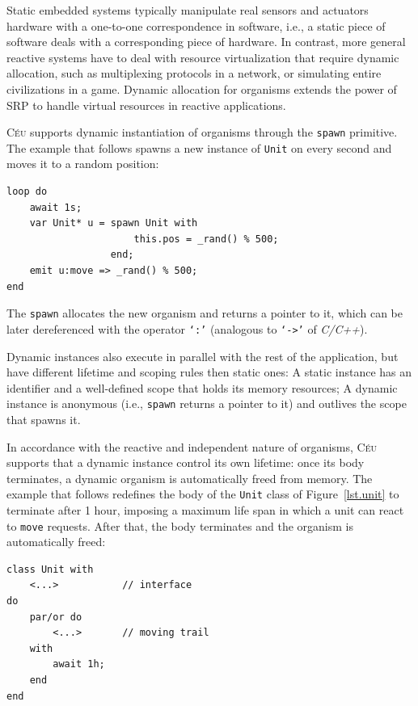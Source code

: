 \documentclass{acm_proc_article-sp}
\newcommand{\CEU}{\textsc{C\'{e}u}\xspace}
\newcommand{\code}[1] {{\small{\texttt{#1}}}}
\newcommand{\1}{\;}
\newcommand{\2}{\;\;}
\newcommand{\3}{\;\;\;}
\newcommand{\5}{\;\;\;\;\;}
\begin{document}
Static embedded systems typically manipulate real sensors and actuators 
hardware with a one-to-one correspondence in software, i.e., a static piece of 
software deals with a corresponding piece of hardware.
%
In contrast, more general reactive systems have to deal with resource 
virtualization that require dynamic allocation, such as multiplexing protocols 
in a network, or simulating entire civilizations in a game.
%
Dynamic allocation for organisms extends the power of SRP to handle virtual 
resources in reactive applications.

\CEU supports dynamic instantiation of organisms through the \code{spawn} 
primitive.
The example that follows spawns a new instance of \code{Unit} on
every second and moves it to a random position:

\begin{lstlisting}
loop do
    await 1s;
    var Unit* u = spawn Unit with
                      this.pos = _rand() % 500;
                  end;
    emit u:move => _rand() % 500;
end
\end{lstlisting}

The \code{spawn} allocates the new organism and returns a pointer to it, which 
can be later dereferenced with the operator \code{`:'} (analogous to 
\code{`->'} of \emph{C/C++}).


Dynamic instances also execute in parallel with the rest of the application, 
but have different lifetime and scoping rules then static ones:
%
A static instance has an identifier and a well-defined scope that holds its 
memory resources;
A dynamic instance is anonymous (i.e., \code{spawn} returns a pointer to it) 
and outlives the scope that spawns it.

In accordance with the reactive and independent nature of organisms, \CEU 
supports that a dynamic instance control its own lifetime:
once its body terminates, a dynamic organism is automatically freed from 
memory.
%
The example that follows redefines the body of the \code{Unit} class of 
Figure~\ref{lst.unit} to terminate after 1 hour, imposing a maximum life span 
in which a unit can react to \code{move} requests.
After that, the body terminates and the organism is automatically freed:

\begin{lstlisting}
class Unit with
    <...>           // interface
do
    par/or do
        <...>       // moving trail
    with
        await 1h;
    end
end
\end{lstlisting}
\end{document}
